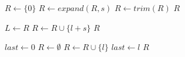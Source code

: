 \begin{algorithm}
\caption{}\label{euclid}
\begin{algorithmic}[1]

	\State $R \gets \{0\}$
	\State $R \gets expand(R,s)$
	\State $R \gets trim(R)$
	\EndFor
	\State \Return $R$
\EndFunction
\newline

	\State $L \gets R$
	\State $R \gets R \cup \{l+s\}$
	\EndFor
	\State \Return $R$
\EndFunction
\newline

	\State $last \gets 0$
	\State $R \gets \emptyset$
				\State $R \gets R \cup \{l\}$
				\State $last \gets l$
		\EndIf
	\EndFor
	\State \Return $R$
\EndFunction
\newline

\end{algorithmic}
\end{algorithm}